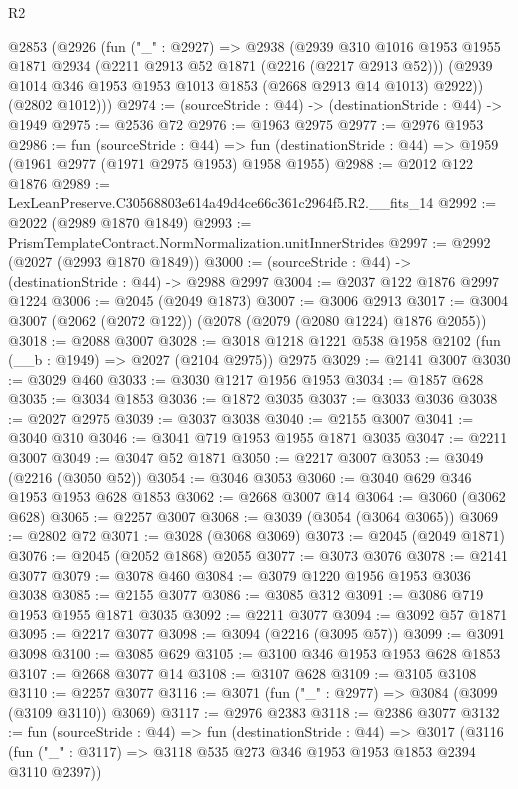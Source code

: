 \begin{lexlean}{R2}
\begin{coremodule}
  @2853
    (@2926
      (fun ("_" : @2927) =>
      @2938
        (@2939
          @310
          @1016
          @1953
          @1955
          @1871
          @2934
          (@2211 @2913 @52 @1871 (@2216 (@2217 @2913 @52)))
          (@2939 @1014 @346 @1953 @1953 @1013 @1853 (@2668 @2913 @14 @1013) @2922))
        (@2802 @1012)))
@2974 := (sourceStride : @44) -> (destinationStride : @44) -> @1949
@2975 := @2536 @72
@2976 := @1963 @2975
@2977 := @2976 @1953
@2986 := fun (sourceStride : @44) =>
  fun (destinationStride : @44) => @1959 (@1961 @2977 (@1971 @2975 @1953) @1958 @1955)
@2988 := @2012 @122 @1876
@2989 := LexLeanPreserve.C30568803e614a49d4ce66c361c2964f5.R2.__fits_14
@2992 := @2022 (@2989 @1870 @1849)
@2993 := PrismTemplateContract.NormNormalization.unitInnerStrides
@2997 := @2992 (@2027 (@2993 @1870 @1849))
@3000 := (sourceStride : @44) -> (destinationStride : @44) -> @2988 @2997
@3004 := @2037 @122 @1876 @2997 @1224
@3006 := @2045 (@2049 @1873)
@3007 := @3006 @2913
@3017 := @3004 @3007 (@2062 (@2072 @122)) (@2078 (@2079 (@2080 @1224) @1876 @2055))
@3018 := @2088 @3007
@3028 := @3018 @1218 @1221 @538 @1958 @2102 (fun (__b : @1949) => @2027 (@2104 @2975)) @2975
@3029 := @2141 @3007
@3030 := @3029 @460
@3033 := @3030 @1217 @1956 @1953
@3034 := @1857 @628
@3035 := @3034 @1853
@3036 := @1872 @3035
@3037 := @3033 @3036
@3038 := @2027 @2975
@3039 := @3037 @3038
@3040 := @2155 @3007
@3041 := @3040 @310
@3046 := @3041 @719 @1953 @1955 @1871 @3035
@3047 := @2211 @3007
@3049 := @3047 @52 @1871
@3050 := @2217 @3007
@3053 := @3049 (@2216 (@3050 @52))
@3054 := @3046 @3053
@3060 := @3040 @629 @346 @1953 @1953 @628 @1853
@3062 := @2668 @3007 @14
@3064 := @3060 (@3062 @628)
@3065 := @2257 @3007
@3068 := @3039 (@3054 (@3064 @3065))
@3069 := @2802 @72
@3071 := @3028 (@3068 @3069)
@3073 := @2045 (@2049 @1871)
@3076 := @2045 (@2052 @1868) @2055
@3077 := @3073 @3076
@3078 := @2141 @3077
@3079 := @3078 @460
@3084 := @3079 @1220 @1956 @1953 @3036 @3038
@3085 := @2155 @3077
@3086 := @3085 @312
@3091 := @3086 @719 @1953 @1955 @1871 @3035
@3092 := @2211 @3077
@3094 := @3092 @57 @1871
@3095 := @2217 @3077
@3098 := @3094 (@2216 (@3095 @57))
@3099 := @3091 @3098
@3100 := @3085 @629
@3105 := @3100 @346 @1953 @1953 @628 @1853
@3107 := @2668 @3077 @14
@3108 := @3107 @628
@3109 := @3105 @3108
@3110 := @2257 @3077
@3116 := @3071 (fun ("_" : @2977) => @3084 (@3099 (@3109 @3110)) @3069)
@3117 := @2976 @2383
@3118 := @2386 @3077
@3132 := fun (sourceStride : @44) =>
  fun (destinationStride : @44) =>
  @3017 (@3116 (fun ("_" : @3117) => @3118 @535 @273 @346 @1953 @1953 @1853 @2394 @3110 @2397))

\end{coremodule}
\end{lexlean}
